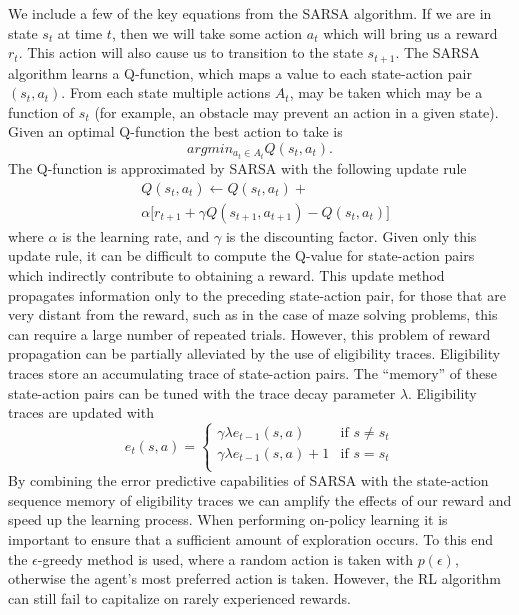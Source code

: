 We include a few of the key equations from the SARSA algorithm. If we are in state
$s_t$ at time $t$, then we will take some action $a_t$ which will bring us a
reward $r_t$. This action will also cause us to transition to the state
$s_{t+1}$. The SARSA algorithm learns a Q-function, which maps a value to each 
state-action pair $(s_t,a_t)$. From each state multiple actions $A_t$, may be taken
which may be a function of $s_t$ (for example, an obstacle may prevent an action
in a given state). Given an optimal Q-function the best action to take is
\begin{equation} argmin_{a_t \in A_t} Q(s_t,a_t).
\end{equation}
\noindent The Q-function is approximated by SARSA with the following update rule
\begin{eqnarray} 
& Q(s_t,a_t) \leftarrow Q(s_t,a_t)+ \nonumber \\ 
& \alpha \big[r_{t+1}+\gamma Q(s_{t+1},a_{t+1}) - Q(s_t,a_t)\big] 
\end{eqnarray}
\noindent where $\alpha$ is the learning rate, and $\gamma$ is the discounting
factor. Given only this update rule, it can be difficult to compute the Q-value
for state-action pairs which indirectly contribute to obtaining a reward. This
update method propagates information only to the preceding state-action pair,
for those that are very distant from the reward, such as in the case of maze
solving problems, this can require a large number of repeated trials. However,
this problem of reward propagation can be partially alleviated by the use of
eligibility traces. Eligibility traces store an accumulating trace of
state-action pairs. The ``memory'' of these state-action pairs can be tuned with
the trace decay parameter $\lambda$. Eligibility traces are updated with
\begin{equation}
e_t(s,a) = 	\begin{cases}
			\gamma \lambda e_{t-1}(s,a) & \mbox{if } s \neq s_t \\ 
			\gamma \lambda e_{t-1}(s,a)+1 & \mbox{if }s = s_t \\
			\end{cases}
\end{equation} 
\noindent By combining the error predictive capabilities of SARSA with the
state-action sequence memory of eligibility traces we can amplify the effects
of our reward and speed up the learning process. When performing on-policy
learning it is important to ensure that a sufficient amount of exploration
occurs. To this end the $\epsilon$-greedy method is used, where a random
action is taken with $p(\epsilon)$, otherwise the agent's most preferred 
action is taken. However, the RL algorithm can still fail to capitalize on rarely
experienced rewards. 